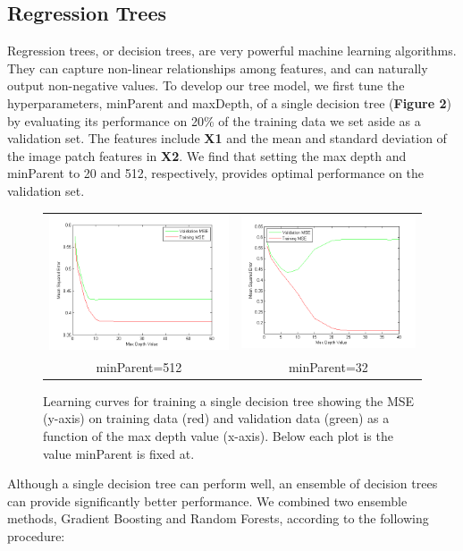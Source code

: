 \documentclass[12pt] {article}
\renewcommand{\baselinestretch}{1.5} %
\begin{document}
\subsection{Regression Trees}
Regression trees, or decision trees, are very powerful machine learning algorithms. They can capture non-linear relationships among features, and can naturally output non-negative values. To develop our tree model, we first tune the hyperparameters, minParent and maxDepth, of a single decision tree (\textbf{Figure 2}) by evaluating its performance on 20\% of the training data we set aside as a validation set. The features include \textbf{X1} and the mean and standard deviation of the image patch features in \textbf{X2}. We find that setting the max depth and minParent to 20 and 512, respectively, provides optimal performance on the validation set.
\renewcommand{\baselinestretch}{1.0} %
\begin{figure}[h!] \centering
\begin{tabular}{cc}
\includegraphics[width=.45\textwidth]{figdir/maxDepthVersusMSE.png} &
\includegraphics[width=.45\textwidth]{figdir/maxDepthVersusMSE2.png} \\
minParent=512 & minParent=32 \\
\end{tabular}
\caption{Learning curves for training a single decision tree showing the MSE (y-axis) on training data (red) and validation data (green) as a function of the max depth value (x-axis). Below each plot is the value minParent is fixed at.}
\end{figure}
\renewcommand{\baselinestretch}{1.5} %
Although a single decision tree can perform well, an ensemble of decision trees can provide significantly better performance. We combined two ensemble methods, Gradient Boosting and Random Forests, according to the following procedure:
\end{document}
